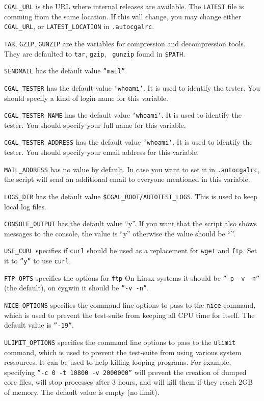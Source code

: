 {\tt CGAL\_URL} is the URL where internal releases are available.
The {\tt LATEST} file is comming from the same location. If this will change,
you may change either {\tt CGAL\_URL}, or {\tt LATEST\_LOCATION}
in {\tt .autocgalrc}.

{\tt TAR}, {\tt GZIP}, {\tt GUNZIP} are the variables for compression and
decompression tools.  They are defaulted to {\tt tar}, {\tt gzip}, {\tt
gunzip} found in {\tt \$PATH}.

{\tt SENDMAIL} has the default value {\tt ''mail''}.

{\tt CGAL\_TESTER} has the default value {\tt `whoami`}.  It is used to
identify the tester.  You should specify a kind of login name for this
variable.

{\tt CGAL\_TESTER\_NAME} has the default value {\tt `whoami`}.  It is used to
identify the tester.  You should specify your full name for this variable.

{\tt CGAL\_TESTER\_ADDRESS} has the default value {\tt `whoami`}.  It is used
to identify the tester.  You should specify your email address for this
variable.

{\tt MAIL\_ADDRESS} has no value by default. In case you want to
set it in {\tt .autocgalrc}, the script will send an additional email to
everyone mentioned in this variable.

{\tt LOGS\_DIR} has the default value {\tt \$CGAL\_ROOT/AUTOTEST\_LOGS}.  This
is used to keep local log files.

{\tt CONSOLE\_OUTPUT} has the default value ``y''. If you want that the script
 also shows messages to the console, the value is ``y'' otherwise the value
should be ``''.

{\tt USE\_CURL} specifies if {\tt curl} should be used as a replacement for
{\tt wget} and {\tt ftp}.  Set it to {\tt ''y''} to use {\tt curl}.

{\tt FTP\_OPTS} specifies the options for {\tt ftp}   On Linux systems 
it should be {\tt ''-p -v -n''} (the default), on cygwin it should be {\tt ''-v -n''}.

{\tt NICE\_OPTIONS} specifies the command line options to pass to the
{\tt nice} command, which is used to prevent the test-suite from keeping
all CPU time for itself.  The default value is {\tt ''-19''}.

{\tt ULIMIT\_OPTIONS} specifies the command line options to pass to the
{\tt ulimit} command, which is used to prevent the test-suite from using
various system ressources.  It can be used to help killing looping programs.
For example, specifying {\tt ''-c 0 -t 10800 -v 2000000''} will prevent
the creation of dumped core files, will stop processes after 3 hours,
and will kill them if they reach 2GB of memory.
The default value is empty (no limit).

